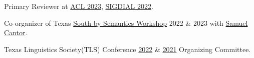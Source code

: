 Primary Reviewer at \href{https://2023.aclweb.org}{ACL 2023}, \href{https://2022.sigdial.org}{SIGDIAL 2022}.

Co-organizer of Texas \href{https://sites.google.com/utexas.edu/sxsw}{South by Semantics Workshop} 2022 \& 2023 with \href{https://www.cantwolf.com}{Samuel Cantor}.

Texas Linguistics Society(TLS) Conference \href{http://tls.ling.utexas.edu/2022/}{2022} \& \href{http://tls.ling.utexas.edu/2021/}{2021} Organizing Committee.
